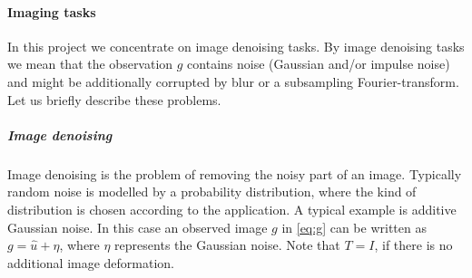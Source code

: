 \documentclass[enabledeprecatedfontcommands,cleardoublepage=empty,headsepline,twoside,11pt,DIV=15,BCOR=12mm,final]{scrartcl}
\begin{document}

\paragraph{Imaging tasks} \label{Sec:ImagingTasks}

In this project we concentrate on image denoising tasks. By image denoising tasks we mean that the observation $g$ contains noise (Gaussian and/or impulse noise) and might be additionally corrupted by blur or a subsampling Fourier-transform. Let us briefly describe these problems.

\subparagraph{Image denoising}

Image denoising is the problem of removing the noisy part of an image. Typically random noise is modelled by a probability distribution, where the kind of distribution is chosen according to the application. A typical example is additive Gaussian noise. In this case an observed image $g$ in \eqref{eq:g} can be written as $g = \hat{u} + \eta$, where $\eta$ represents the Gaussian noise. Note that $T=I$, if there is no additional image deformation.
\end{document}
